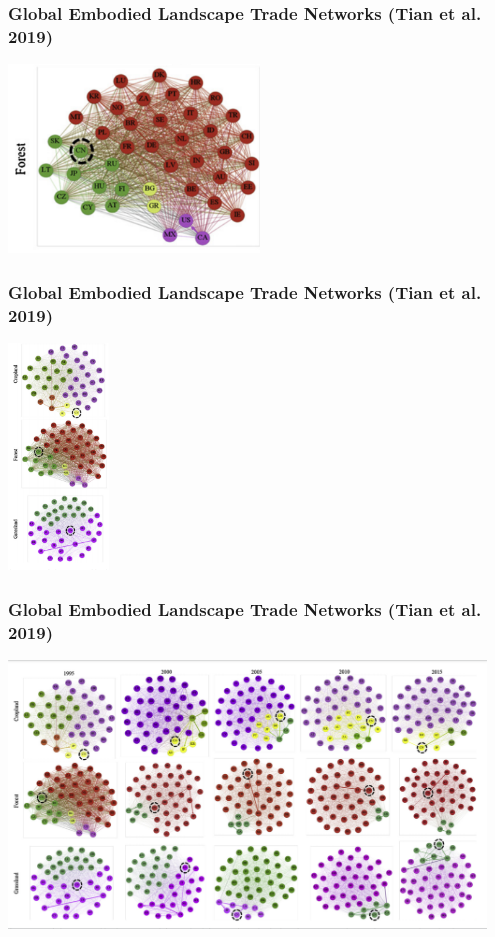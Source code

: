 \documentclass[aspectratio=169]{beamer}
\begin{document}
\begin{frame}
  \frametitle{Global Embodied Landscape Trade Networks (Tian et al. 2019)}
    \begin{center}
    \includegraphics[width=0.5\textwidth]{images/Tian_2019_Fig3_inset_inset.png}  
    \end{center}
\end{frame}


\begin{frame}
  \frametitle{Global Embodied Landscape Trade Networks (Tian et al. 2019)}
  \begin{center}
  \includegraphics[width=0.2\textwidth]{images/Tian_2019_Fig3_inset.png}
  \end{center}
\end{frame}

\begin{frame}
  \frametitle{Global Embodied Landscape Trade Networks (Tian et al. 2019)}
  \begin{center}
  \includegraphics[width=0.95\textwidth]{images/Tian_2019_Fig3.png}
  \end{center}
\end{frame}
\end{document}
